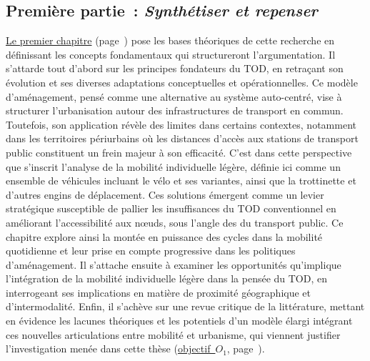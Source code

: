 \begin{refsegment}
\subsection*{Première partie~: \textsl{Synthétiser et repenser}
    \label{introduction-generale:annonce-plan-1}
    }

\hyperref[chap1:titre]{Le premier chapitre} (page~\pageref{chap1:titre}) pose les bases théoriques de cette recherche en définissant les concepts fondamentaux qui structureront l’argumentation. Il s’attarde tout d’abord sur les principes fondateurs du \acrshort{TOD}, en retraçant son évolution et ses diverses adaptations conceptuelles et opérationnelles. Ce modèle d’aménagement, pensé comme une alternative au système auto-centré, vise à structurer l’urbanisation autour des infrastructures de transport en commun. Toutefois, son application révèle des limites dans certains contextes, notamment dans les territoires périurbains où les distances d’accès aux stations de transport public constituent un frein majeur à son efficacité. C’est dans cette perspective que s’inscrit l’analyse de la mobilité individuelle légère, définie ici comme un ensemble de véhicules incluant le vélo et ses variantes, ainsi que la trottinette et d’autres engins de déplacement. Ces solutions émergent comme un levier stratégique susceptible de pallier les insuffisances du \acrshort{TOD} conventionnel en améliorant l’accessibilité aux nœuds, sous l'angle des  du transport public. Ce chapitre explore ainsi la montée en puissance des cycles dans la mobilité quotidienne et leur prise en compte progressive dans les politiques d’aménagement. Il s’attache ensuite à examiner les opportunités qu’implique l’intégration de la mobilité individuelle légère dans la pensée du \acrshort{TOD}, en interrogeant ses implications en matière de proximité géographique et d’intermodalité. Enfin, il s’achève sur une revue critique de la littérature, mettant en évidence les lacunes théoriques et les potentiels d’un modèle élargi intégrant ces nouvelles articulations entre mobilité et urbanisme, qui viennent justifier l’investigation menée dans cette thèse (\hyperref[objectif-1]{objectif~\(O_1\)}, page~\pageref{objectif-1}).%


\end{refsegment}
